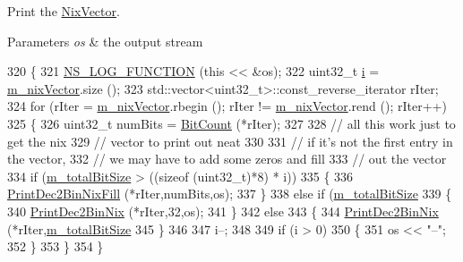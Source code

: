 Print the \hyperlink{classns3_1_1NixVector}{Nix\+Vector}. 


\begin{DoxyParams}{Parameters}
{\em os} & the output stream \\
\hline
\end{DoxyParams}

\begin{DoxyCode}
320 \{
321   \hyperlink{log-macros-disabled_8h_a90b90d5bad1f39cb1b64923ea94c0761}{NS\_LOG\_FUNCTION} (\textcolor{keyword}{this} << &os);
322   uint32\_t \hyperlink{bernuolliDistribution_8m_a6f6ccfcf58b31cb6412107d9d5281426}{i} = \hyperlink{classns3_1_1NixVector_a8e3d193156da514255bb033ceb8500df}{m\_nixVector}.size ();
323   std::vector<uint32\_t>::const\_reverse\_iterator rIter;
324   \textcolor{keywordflow}{for} (rIter = \hyperlink{classns3_1_1NixVector_a8e3d193156da514255bb033ceb8500df}{m\_nixVector}.rbegin (); rIter != \hyperlink{classns3_1_1NixVector_a8e3d193156da514255bb033ceb8500df}{m\_nixVector}.rend (); rIter++)
325     \{
326       uint32\_t numBits = \hyperlink{classns3_1_1NixVector_a2110776224e52b8fe4220b1e51b946a6}{BitCount} (*rIter);
327 
328       \textcolor{comment}{// all this work just to get the nix }
329       \textcolor{comment}{// vector to print out neat}
330 
331       \textcolor{comment}{// if it's not the first entry in the vector, }
332       \textcolor{comment}{// we may have to add some zeros and fill }
333       \textcolor{comment}{// out the vector}
334       \textcolor{keywordflow}{if} (\hyperlink{classns3_1_1NixVector_a7a49e3aa07e9d0d45fd509dc5f95857a}{m\_totalBitSize} > ((\textcolor{keyword}{sizeof} (uint32\_t)*8) * i))
335         \{
336           \hyperlink{classns3_1_1NixVector_a9d5f9cbc3a06324f163078eb73932d3d}{PrintDec2BinNixFill} (*rIter,numBits,os);
337         \}
338       \textcolor{keywordflow}{else} \textcolor{keywordflow}{if} (\hyperlink{classns3_1_1NixVector_a7a49e3aa07e9d0d45fd509dc5f95857a}{m\_totalBitSize}%
339         \{
340           \hyperlink{classns3_1_1NixVector_a6cfc280674edc3350bb797a15b44c093}{PrintDec2BinNix} (*rIter,32,os);
341         \}
342       \textcolor{keywordflow}{else}
343         \{
344           \hyperlink{classns3_1_1NixVector_a6cfc280674edc3350bb797a15b44c093}{PrintDec2BinNix} (*rIter,\hyperlink{classns3_1_1NixVector_a7a49e3aa07e9d0d45fd509dc5f95857a}{m\_totalBitSize}%
345         \}
346 
347       i--;
348 
349       \textcolor{keywordflow}{if} (i > 0)
350         \{
351           os << \textcolor{stringliteral}{"--"};
352         \}
353     \}
354 \}
\end{DoxyCode}


